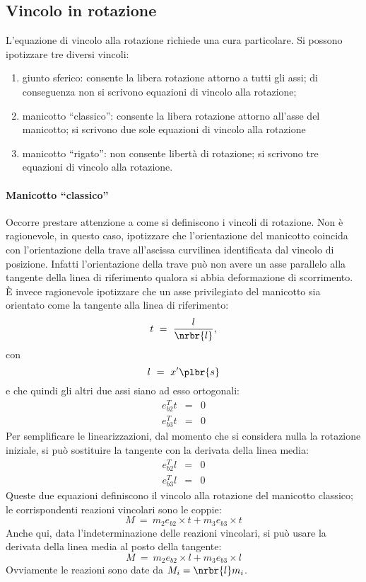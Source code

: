 \documentclass[12pt,dvips,fleqn,italian]{article}
\begin{document}
\subsection*{Vincolo in rotazione}
L'equazione di vincolo alla rotazione richiede una cura particolare.
Si possono ipotizzare tre diversi vincoli:
\begin{enumerate}
	\item giunto sferico: consente la libera rotazione attorno a tutti
	gli assi; di conseguenza non si scrivono equazioni di vincolo
	alla rotazione;
	\item manicotto ``classico'': consente la libera rotazione attorno
	all'asse del manicotto; si scrivono due sole equazioni di vincolo
	alla rotazione
	\item manicotto ``rigato'': non consente libert\`a di rotazione;
	si scrivono tre equazioni di vincolo alla rotazione.
\end{enumerate}


\paragraph*{Manicotto ``classico''}
Occorre prestare attenzione a come si definiscono i vincoli di rotazione.
Non \`e ragionevole, in questo caso, ipotizzare che l'orientazione 
del manicotto coincida con l'orientazione della trave all'ascissa
curvilinea identificata dal vincolo di posizione.
Infatti l'orientazione della trave pu\`o non avere un asse parallelo
alla tangente della linea di riferimento qualora si abbia deformazione
di scorrimento.
\`E invece ragionevole ipotizzare che un asse privilegiato del manicotto
sia orientato come la tangente alla linea di riferimento:
\begin{displaymath}
	t \ = \ \frac{l}{\nrbr{l}} ,
\end{displaymath}
con 
\begin{displaymath}
	l \ = \ x'\plbr{s}
\end{displaymath}
e che quindi gli altri due assi siano ad esso ortogonali:
\begin{eqnarray*}
	e_{b2}^T t & = & 0 \\
	e_{b3}^T t & = & 0
\end{eqnarray*}
Per semplificare le linearizzazioni, dal momento che si considera nulla
la rotazione iniziale, si pu\`o sostituire la tangente
con la derivata della linea media:
\begin{eqnarray*}
	e_{b2}^T l & = & 0 \\
	e_{b3}^T l & = & 0
\end{eqnarray*}
Queste due equazioni definiscono il vincolo alla rotazione del manicotto 
classico; le corrispondenti reazioni vincolari sono le coppie:
\begin{displaymath}
	M \ = \ m_2 e_{b2}\times{t} + m_3 e_{b3}\times{t}
\end{displaymath}
Anche qui, data l'indeterminazione delle reazioni vincolari, si pu\`o 
usare la derivata della linea media al posto della tangente:
\begin{displaymath}
	M \ = \ m_2 e_{b2}\times{l} + m_3 e_{b3}\times{l}
\end{displaymath}
Ovviamente le reazioni sono date da $M_i=\nrbr{l}m_i$.
\end{document}
